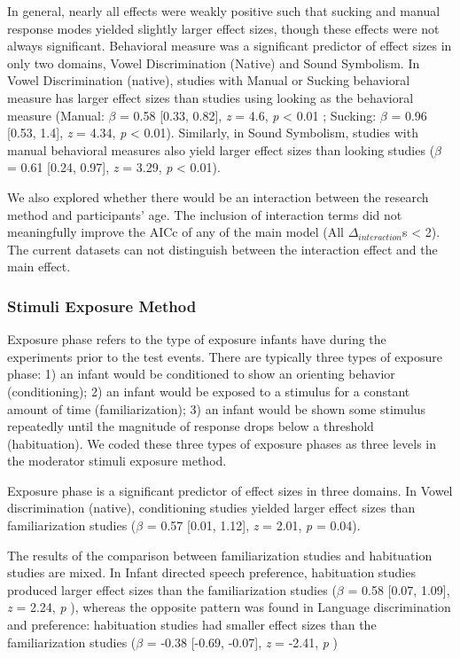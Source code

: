 \documentclass[10pt, letterpaper]{article}
\begin{document}
In general, nearly all effects were weakly positive such that sucking
and manual response modes yielded slightly larger effect sizes, though
these effects were not always significant. Behavioral measure was a
significant predictor of effect sizes in only two domains, Vowel
Discrimination (Native) and Sound Symbolism. In Vowel Discrimination
(native), studies with Manual or Sucking behavioral measure has larger
effect sizes than studies using looking as the behavioral measure
(Manual: \(\beta\) = 0.58 {[}0.33, 0.82{]}, \emph{z} = 4.6, \emph{p}
\textless{} 0.01 ; Sucking: \(\beta\) = 0.96 {[}0.53, 1.4{]}, \emph{z} =
4.34, \emph{p} \textless{} 0.01). Similarly, in Sound Symbolism, studies
with manual behavioral measures also yield larger effect sizes than
looking studies (\(\beta\) = 0.61 {[}0.24, 0.97{]}, \emph{z} = 3.29,
\emph{p} \textless{} 0.01).

We also explored whether there would be an interaction between the
research method and participants' age. The inclusion of interaction
terms did not meaningfully improve the AICc of any of the main model
(All \(\Delta_{interaction}\)s \textless{} 2). The current datasets can
not distinguish between the interaction effect and the main effect.

\hypertarget{stimuli-exposure-method}{%
\subsubsection{Stimuli Exposure Method}\label{stimuli-exposure-method}}

Exposure phase refers to the type of exposure infants have during the
experiments prior to the test events. There are typically three types of
exposure phase: 1) an infant would be conditioned to show an orienting
behavior (conditioning); 2) an infant would be exposed to a stimulus for
a constant amount of time (familiarization); 3) an infant would be shown
some stimulus repeatedly until the magnitude of response drops below a
threshold (habituation). We coded these three types of exposure phases
as three levels in the moderator stimuli exposure method.

Exposure phase is a significant predictor of effect sizes in three
domains. In Vowel discrimination (native), conditioning studies yielded
larger effect sizes than familiarization studies (\(\beta\) = 0.57
{[}0.01, 1.12{]}, \emph{z} = 2.01, \emph{p} = 0.04).

The results of the comparison between familiarization studies and
habituation studies are mixed. In Infant directed speech preference,
habituation studies produced larger effect sizes than the
familiarization studies (\(\beta\) = 0.58 {[}0.07, 1.09{]}, \emph{z} =
2.24, \emph{p} ), whereas the opposite pattern was found in Language
discrimination and preference: habituation studies had smaller effect
sizes than the familiarization studies (\(\beta\) = -0.38 {[}-0.69,
-0.07{]}, \emph{z} = -2.41, \emph{p} )
\end{document}
